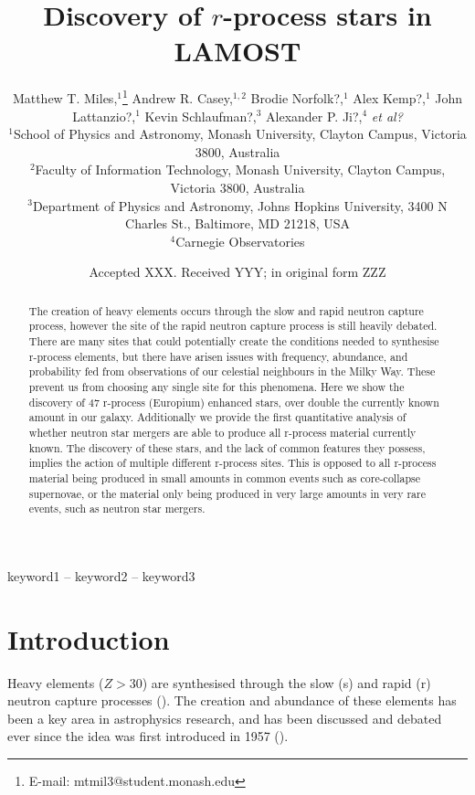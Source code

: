 \documentclass[a4paper,fleqn,usenatbib]{mnras}
\title[Discovery of r-process stars in LAMOST]{Discovery of $r$-process stars in LAMOST}
\author[Matthew T. Miles et al.]{Matthew T. Miles,$^{1}$\thanks{E-mail: mtmil3@student.monash.edu}
	Andrew R. Casey,$^{1,2}$
	Brodie Norfolk?,$^{1}$
	Alex Kemp?,$^{1}$\newauthor
	John Lattanzio?,$^{1}$
	Kevin Schlaufman?,$^{3}$
	Alexander P. Ji?,$^{4}$
	\emph{et al?}
	\\
	$^{1}$School of Physics and Astronomy, Monash University, Clayton Campus, Victoria 3800, Australia\\
	$^{2}$Faculty of Information Technology, Monash University, Clayton Campus, Victoria 3800, Australia\\
	$^{3}$Department of Physics and Astronomy, Johns Hopkins University, 3400 N Charles St., Baltimore, MD 21218, USA\\
	$^{4}$Carnegie Observatories
}
\date{Accepted XXX. Received YYY; in original form ZZZ}
\begin{document}
	\label{firstpage}
	\pagerange{\pageref{firstpage}--\pageref{lastpage}}
	\maketitle
	
	\begin{abstract}
		The creation of heavy elements occurs through the slow and rapid neutron capture process, however the site of the rapid neutron capture process is still heavily debated. There are many sites that could potentially create the conditions needed to synthesise r-process elements, but there have arisen issues with frequency, abundance, and probability fed from observations of our celestial neighbours in the Milky Way. These prevent us from choosing any single site for this phenomena. Here we show the discovery of 47 r-process (Europium) enhanced stars, over double the currently known amount in our galaxy. Additionally we provide the first quantitative analysis of whether neutron star mergers are able to produce all r-process material currently known. The discovery of these stars, and the lack of common features they possess, implies the action of multiple different r-process sites. This is opposed to all r-process material being produced in small amounts in common events such as core-collapse supernovae, or the material only being produced in very large amounts in very rare events, such as neutron star mergers. 
	\end{abstract}
	
	\begin{keywords}
		keyword1 -- keyword2 -- keyword3
	\end{keywords}
	
	
	\section{Introduction}
	
	Heavy elements ($Z > 30$) are synthesised through the slow (s) and rapid (r) neutron capture processes (\cite{Sneden2008}). The creation and abundance of these elements has been a key area in astrophysics research, and has been discussed and debated ever since the idea was first introduced in 1957 (\cite{Burbidge1957}). 
	
\end{document}
